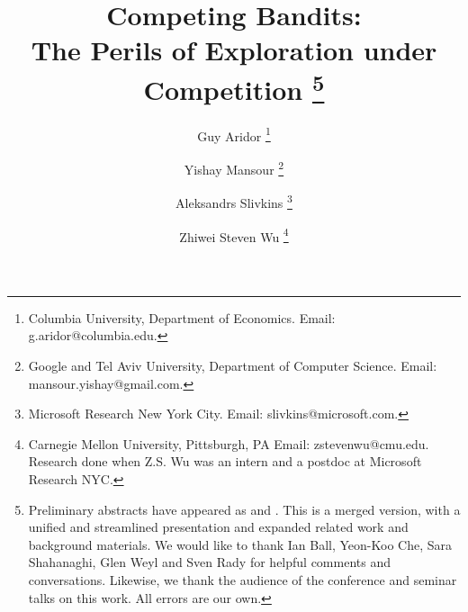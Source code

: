 \documentclass[12pt]{article}
\begin{document}

\title{\vspace{-12mm}Competing Bandits:\\
The Perils of Exploration under Competition%
\thanks{Preliminary abstracts have appeared as
\citet*{CompetingBandits-itcs18} and \citet*{CompetingBandits-ec19}.
This is a merged version, with a unified and streamlined presentation and expanded related work and background materials.  \newline \indent %
We would like to thank Ian Ball, Yeon-Koo Che, Sara Shahanaghi, Glen Weyl and Sven Rady for helpful comments and conversations. Likewise, we thank the audience of the conference and seminar talks on this work.
All errors are our own.}}


\author{Guy Aridor
\footnote{Columbia University, Department of Economics. Email: g.aridor@columbia.edu.}
\and \hspace{-0.5cm}
\rule{0.0in}{0pt}
Yishay Mansour
\footnote{Google and Tel Aviv University, Department of Computer Science. Email: mansour.yishay@gmail.com.}
\and \hspace{-0.5cm}
\rule{0.0in}{0pt}
Aleksandrs Slivkins
\footnote{Microsoft Research New York City. Email: slivkins@microsoft.com.}
\and \hspace{-0.5cm}
\rule{0.0in}{0pt}
Zhiwei Steven Wu%
\footnote{Carnegie Mellon University, Pittsburgh, PA
Email: zstevenwu@cmu.edu.\newline
Research done when Z.S. Wu was an intern and a postdoc at Microsoft Research NYC.}
}
\date{}

\maketitle
\end{document}
